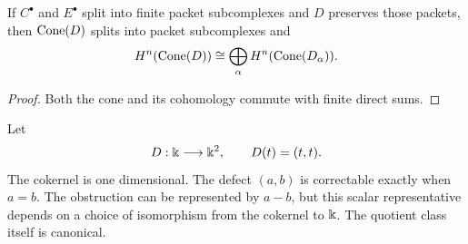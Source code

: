 \begin{corollary}\label{cor:packet_obstruction_complexes}
If $C^\bullet$ and $E^\bullet$ split into finite packet subcomplexes and $D$ preserves those packets, then $\operatorname{Cone}(D)$ splits into packet subcomplexes and
\[
H^n(\operatorname{Cone}(D))
\cong
\bigoplus_\alpha H^n(\operatorname{Cone}(D_\alpha)).
\]
\end{corollary}

\begin{proof}
Both the cone and its cohomology commute with finite direct sums.
\end{proof}

\begin{example}\label{ex:two_component_obstruction}
Let
\[
D:\Bbbk\longrightarrow\Bbbk^2,
\qquad
D(t)=(t,t).
\]
The cokernel is one dimensional.  The defect $(a,b)$ is correctable exactly when $a=b$.  The obstruction can be represented by $a-b$, but this scalar representative depends on a choice of isomorphism from the cokernel to $\Bbbk$.  The quotient class itself is canonical.
\end{example}

